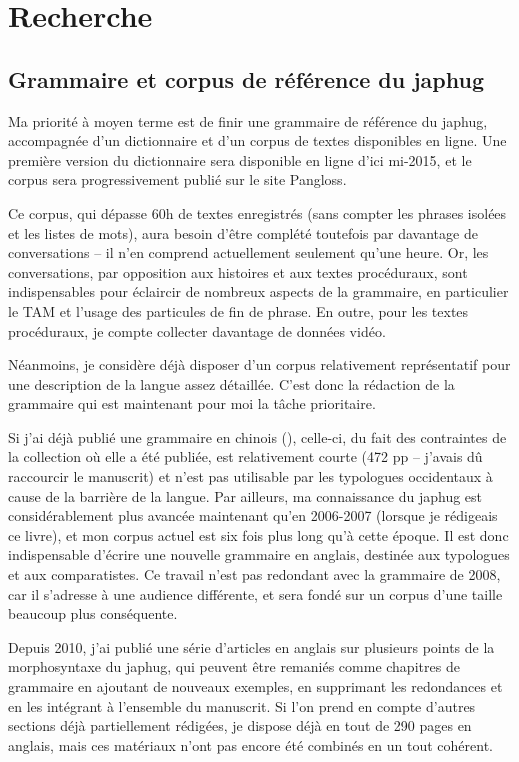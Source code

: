 \documentclass[oldfontcommands,oneside,a4paper,11pt]{article}
\begin{document}
\section{Recherche}

\subsection{Grammaire et corpus de référence du japhug}
Ma priorité à moyen terme est de finir une grammaire de référence du japhug, accompagnée d'un dictionnaire et d'un corpus de textes disponibles en ligne. Une première version du dictionnaire sera disponible en ligne d'ici mi-2015, et le corpus sera progressivement publié sur le site Pangloss. 

Ce corpus, qui dépasse 60h de textes enregistrés (sans compter les phrases isolées et les listes de mots), aura besoin d'être complété toutefois par davantage de conversations -- il n'en comprend actuellement seulement qu'une heure. Or, les conversations, par opposition aux histoires et aux textes procéduraux, sont indispensables pour éclaircir de nombreux aspects de la grammaire, en particulier le TAM et l'usage des particules de fin de phrase. En outre, pour les textes procéduraux, je compte collecter davantage de données vidéo. 

Néanmoins, je considère déjà disposer d'un corpus relativement représentatif pour une description de la langue assez détaillée. C'est donc la rédaction de la grammaire qui est maintenant pour moi la tâche prioritaire.



Si j'ai déjà publié une grammaire en chinois (\citealt{jacques08zh}), celle-ci, du fait des contraintes de la collection où elle a été publiée, est relativement courte (472 pp -- j'avais dû raccourcir le manuscrit) et n'est pas utilisable par les typologues occidentaux à cause de la barrière de la langue. Par ailleurs, ma connaissance du japhug est considérablement plus avancée maintenant qu'en 2006-2007 (lorsque je rédigeais ce livre), et mon corpus actuel est six fois plus long qu'à cette époque. Il est donc indispensable d'écrire une nouvelle grammaire en anglais, destinée aux typologues et aux comparatistes.  Ce travail n'est pas redondant avec la grammaire de 2008, car il s'adresse à une audience différente, et sera fondé sur un corpus d'une taille beaucoup plus conséquente.

Depuis 2010, j'ai publié une série d'articles en anglais sur plusieurs points de la morphosyntaxe du japhug, qui peuvent être remaniés comme chapitres de grammaire en ajoutant de nouveaux exemples, en supprimant les redondances et en les intégrant à l'ensemble du manuscrit. Si l'on prend en compte d'autres sections déjà partiellement rédigées, je dispose déjà en tout de 290 pages en anglais, mais ces matériaux n'ont pas encore été combinés en un  tout cohérent.
\end{document}
